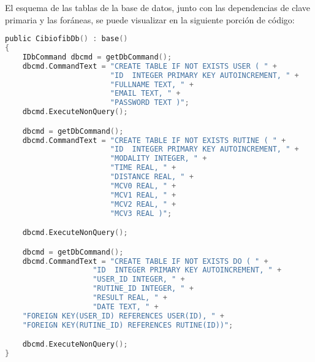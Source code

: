 El esquema de las tablas de la base de datos, junto con las dependencias de clave primaria y las foráneas, se puede visualizar en la siguiente 
porción de código:

\begin{center}
\begin{minipage}{0.8\textwidth}
\begin{lstlisting}[language=c,caption={Sección de código, constructor de la clase CibiofibDb}, label={code: database-code}]
public CibiofibDb() : base()
{
    IDbCommand dbcmd = getDbCommand();
    dbcmd.CommandText = "CREATE TABLE IF NOT EXISTS USER ( " +
                        "ID  INTEGER PRIMARY KEY AUTOINCREMENT, " +
                        "FULLNAME TEXT, " +
                        "EMAIL TEXT, " +
                        "PASSWORD TEXT )";
    dbcmd.ExecuteNonQuery();

    dbcmd = getDbCommand();
    dbcmd.CommandText = "CREATE TABLE IF NOT EXISTS RUTINE ( " +
                        "ID  INTEGER PRIMARY KEY AUTOINCREMENT, " +
                        "MODALITY INTEGER, " +
                        "TIME REAL, " +
                        "DISTANCE REAL, " +
                        "MCV0 REAL, " +
                        "MCV1 REAL, " +
                        "MCV2 REAL, " +
                        "MCV3 REAL )";

    dbcmd.ExecuteNonQuery();

    dbcmd = getDbCommand();
    dbcmd.CommandText = "CREATE TABLE IF NOT EXISTS DO ( " +
                    "ID  INTEGER PRIMARY KEY AUTOINCREMENT, " +
                    "USER_ID INTEGER, " +
                    "RUTINE_ID INTEGER, " +
                    "RESULT REAL, " +
                    "DATE TEXT, " +
    "FOREIGN KEY(USER_ID) REFERENCES USER(ID), " +
    "FOREIGN KEY(RUTINE_ID) REFERENCES RUTINE(ID))";

    dbcmd.ExecuteNonQuery();
}
\end{lstlisting}
\end{minipage}
\end{center}